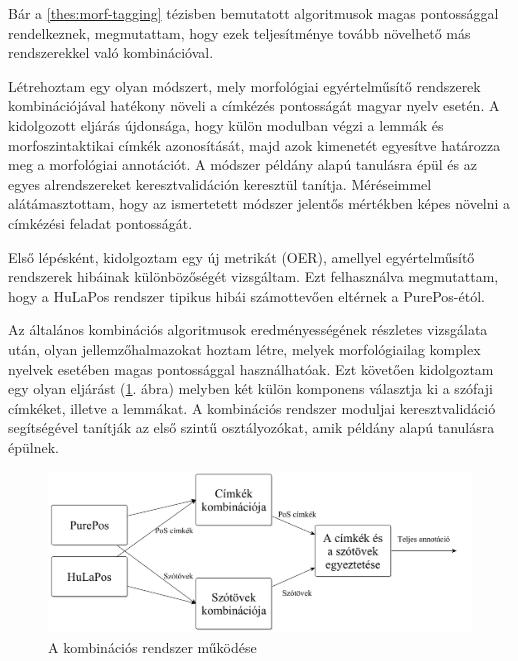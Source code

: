 \thesisline%


Bár a \ref{thes:morf-tagging} tézisben bemutatott algoritmusok magas pontossággal rendelkeznek, megmutattam, hogy ezek teljesítménye tovább növelhető más rendszerekkel való kombinációval. 

\begin{core}
\begin{thesis}
Létrehoztam egy olyan módszert, mely morfológiai egyértelműsítő rendszerek kombinációjával hatékony növeli a címkézés pontosságát magyar nyelv esetén.
A kidolgozott eljárás újdonsága, hogy külön modulban végzi a lemmák és morfoszintaktikai címkék azonosítását, majd azok kimenetét egyesítve határozza meg a morfológiai annotációt.
A módszer példány alapú tanulásra épül és az egyes alrendszereket keresztvalidáción keresztül tanítja.
Méréseimmel alátámasztottam, hogy az ismertetett módszer jelentős mértékben képes növelni a címkézési feladat pontosságát. 
\end{thesis}

\begin{pub}
\cite{Laki2013a,Orosz2013c,Orosz2013d} 
\end{pub}
\end{core}

Első lépésként, kidolgoztam egy új metrikát (OER), amellyel egyértelműsítő rendszerek hibáinak különbözőségét vizsgáltam. 
Ezt felhasználva megmutattam, hogy a HuLaPos rendszer tipikus hibái számottevően eltérnek a PurePos-étól. 

Az általános kombinációs algoritmusok eredményességének részletes vizsgálata után, olyan jellemzőhalmazokat hoztam létre, melyek morfológiailag komplex nyelvek esetében magas pontossággal használhatóak.
Ezt követően kidolgoztam egy olyan eljárást (\ref{fig:comb3_en}. ábra) melyben két külön komponens választja ki a szófaji címkéket, illetve a lemmákat. 
A kombinációs rendszer moduljai keresztvalidáció segítségével tanítják az első szintű osztályozókat, amik példány alapú tanulásra épülnek.

\begin{figure}[H]
  \centering %
  \includegraphics[scale=0.15]{MorphTagging/comb3_hu.png} 
  \caption{A kombinációs rendszer működése}
  \label{fig:comb3_en}
\end{figure}


